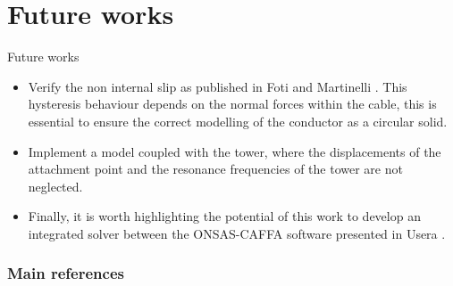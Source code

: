 \documentclass{beamer}
\begin{document}
\section[Conclusion ]{Future works}
\begin{frame}{Future works }
\begin{itemize}
 \item Verify the non internal slip as published in Foti and Martinelli \cite{foti2018finite}. This hysteresis behaviour depends on the normal forces within the cable, this is essential to ensure the correct modelling of the conductor as a circular solid.
\pause 
\item Implement a model coupled with the tower, where the displacements of the attachment point and the resonance frequencies of the tower are not neglected.
 \pause
\item Finally, it is worth highlighting the potential of this work to develop an integrated solver between the ONSAS-CAFFA software presented in Usera \cite{usera2008parallel}. \cite{usera2008parallel}
 
  
\end{itemize}
\end{frame}


\begin{frame}[allowframebreaks]
        \frametitle{Main references}
        
        
\end{frame}

\end{document}
